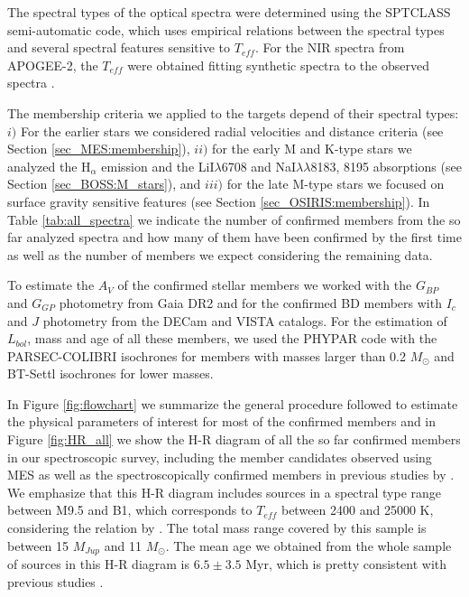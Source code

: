 \documentclass[12pt]{article}
\begin{document}
The spectral types of the optical spectra were determined using the SPTCLASS semi-automatic code, which uses empirical relations between the spectral types and several spectral features sensitive to $T_{eff}$. For the NIR spectra from APOGEE-2, the $T_{eff}$ were obtained fitting synthetic spectra to the observed spectra \citep{Kounkel2018}.

The membership criteria we applied to the targets depend of their spectral types: $i)$ For the earlier stars we considered radial velocities and distance criteria (see Section \ref{sec_MES:membership}), $ii)$ for the early M and K-type stars we analyzed the H$_\alpha$ emission and the LiI$\lambda$6708 and NaI$\lambda\lambda$8183, 8195 absorptions (see Section \ref{sec_BOSS:M_stars}), and $iii)$ for the late M-type stars we focused on surface gravity sensitive features (see Section \ref{sec_OSIRIS:membership}). In Table \ref{tab:all_spectra} we indicate the number of confirmed members from the so far analyzed spectra and how many of them have been confirmed by the first time as well as the number of members we expect considering the remaining data.

To estimate the $A_V$ of the confirmed stellar members we worked with the $G_{BP}$ and $G_{GP}$ photometry from Gaia DR2 and for the confirmed BD members with $I_c$ and $J$ photometry from the DECam and VISTA catalogs. For the estimation of $L_{bol}$, mass and age of all these members, we used the PHYPAR code with the PARSEC-COLIBRI isochrones for members with masses larger than 0.2 $M_\odot$ and BT-Settl isochrones for lower masses. 

In Figure \ref{fig:flowchart} we summarize the general procedure followed to estimate the physical parameters of interest for most of the confirmed members and in Figure \ref{fig:HR_all} we show the H-R diagram of all the so far confirmed members in our spectroscopic survey, including the member candidates observed using MES as well as the spectroscopically confirmed members in previous studies by \citet{Briceno2005,Briceno2007,Downes2014,Downes2015,Briceno2018}. We emphasize that this H-R diagram includes sources in a spectral type range between M9.5 and B1, which corresponds to $T_{eff}$ between 2400 and 25000 K, considering the relation by \citet{Pecaut2013}. The total mass range covered by this sample is between 15 $M_{Jup}$ and 11 $M_\odot$. The mean age we obtained from the whole sample of sources in this H-R diagram is $6.5\pm3.5$ Myr, which is pretty consistent with previous studies \citep[6.1$\pm$2.4; ][ and references therein]{Briceno2018}.
\end{document}
